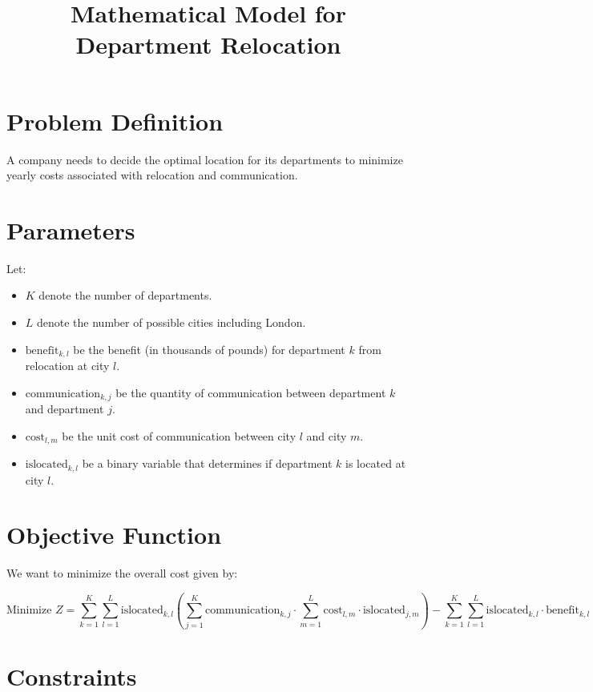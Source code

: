 \documentclass{article}
\begin{document}
\title{Mathematical Model for Department Relocation}
\author{}
\date{}
\maketitle

\section*{Problem Definition}

A company needs to decide the optimal location for its departments to minimize yearly costs associated with relocation and communication.

\section*{Parameters}

Let:
\begin{itemize}
    \item \( K \) denote the number of departments.
    \item \( L \) denote the number of possible cities including London.
    \item \( \text{benefit}_{k, l} \) be the benefit (in thousands of pounds) for department \( k \) from relocation at city \( l \).
    \item \( \text{communication}_{k, j} \) be the quantity of communication between department \( k \) and department \( j \).
    \item \( \text{cost}_{l, m} \) be the unit cost of communication between city \( l \) and city \( m \).
    \item \( \text{islocated}_{k, l} \) be a binary variable that determines if department \( k \) is located at city \( l \).
\end{itemize}

\section*{Objective Function}

We want to minimize the overall cost given by:

\[
\text{Minimize } Z = \sum_{k=1}^{K} \sum_{l=1}^{L} \text{islocated}_{k, l} \left( \sum_{j=1}^{K} \text{communication}_{k, j} \cdot \sum_{m=1}^{L} \text{cost}_{l, m} \cdot \text{islocated}_{j, m} \right) - \sum_{k=1}^{K} \sum_{l=1}^{L} \text{islocated}_{k, l} \cdot \text{benefit}_{k, l}
\]

\section*{Constraints}
\end{document}
